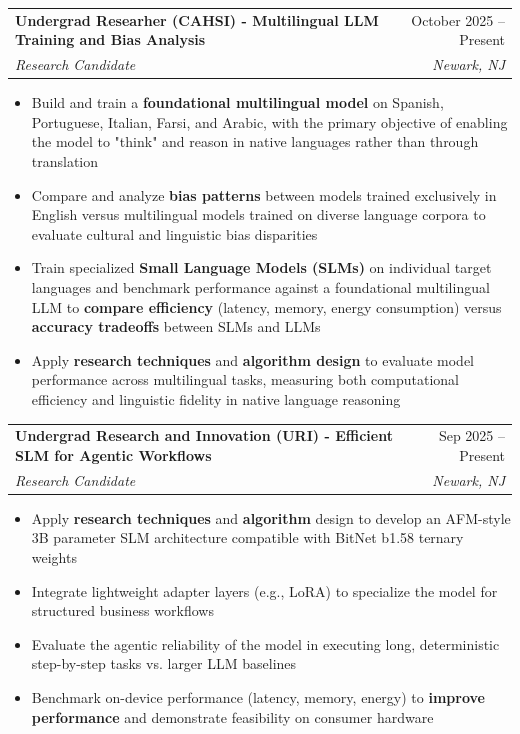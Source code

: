 \documentclass[letterpaper,10pt]{article}
\makeatletter
\newcommand{\resumeItem}[1]{
  \item\small{
    {#1 \vspace{-3pt}}
  }
}
\newcommand{\resumeSubheading}[4]{
  \vspace{-3pt}\item
    \begin{tabular*}{0.97\textwidth}[t]{l@{\extracolsep{\fill}}r}
      \textbf{#1} & #2 \\
      \textit{\small#3} & \textit{\small #4} \\
    \end{tabular*}\vspace{-9pt}
}
\newcommand{\resumeSubSubheading}[2]{
    \item
    \begin{tabular*}{0.97\textwidth}{l@{\extracolsep{\fill}}r}
      \textit{\small#1} & \textit{\small #2} \\
    \end{tabular*}\vspace{-9pt}
}
\newcommand{\resumeSubHeadingListEnd}{\end{itemize}}
\newcommand{\resumeItemListStart}{\begin{itemize}}
\newcommand{\resumeItemListEnd}{\end{itemize}\vspace{-7pt}}
\makeatother
\begin{document}

    \resumeSubheading
        {Undergrad Researher  (CAHSI) - Multilingual LLM Training and Bias Analysis}{October 2025 -- Present}
            {Research Candidate}{Newark, NJ}
            \resumeItemListStart
            \vspace{10pt}
                \resumeItem{Build and train a \textbf{foundational multilingual model} on Spanish, Portuguese, Italian, Farsi, and Arabic, with the primary objective of enabling the model to "think" and reason in native languages rather than through translation}
            \vspace{5pt}
                \resumeItem{Compare and analyze \textbf{bias patterns} between models trained exclusively in English versus multilingual models trained on diverse language corpora to evaluate cultural and linguistic bias disparities}
            \vspace{5pt}
                \resumeItem{Train specialized \textbf{Small Language Models (SLMs)} on individual target languages and benchmark performance against a foundational multilingual LLM to \textbf{compare efficiency} (latency, memory, energy consumption) versus \textbf{accuracy tradeoffs} between SLMs and LLMs}
            \vspace{5pt}
                \resumeItem{Apply \textbf{research techniques} and \textbf{algorithm design} to evaluate model performance across multilingual tasks, measuring both computational efficiency and linguistic fidelity in native language reasoning}
        \resumeItemListEnd
    \vspace{10pt}

    \resumeSubheading
        {Undergrad Research and Innovation (URI) - Efficient SLM for Agentic Workflows}{Sep 2025 -- Present}
            {Research Candidate}{Newark, NJ}
            \resumeItemListStart
            \vspace{10pt}
                \resumeItem{Apply \textbf{research techniques} and \textbf{algorithm} design to develop an AFM-style 3B parameter SLM architecture compatible with BitNet b1.58 ternary weights}
            \vspace{5pt}
                \resumeItem{Integrate lightweight adapter layers (e.g., LoRA) to specialize the model for structured business workflows}
            \vspace{5pt}
                \resumeItem{Evaluate the agentic reliability of the model in executing long, deterministic step-by-step tasks vs. larger LLM baselines}
            \vspace{5pt}
                \resumeItem{Benchmark on-device performance (latency, memory, energy) to \textbf{improve performance} and demonstrate feasibility on consumer hardware}
        \resumeItemListEnd
    \vspace{10pt}
\end{document}

